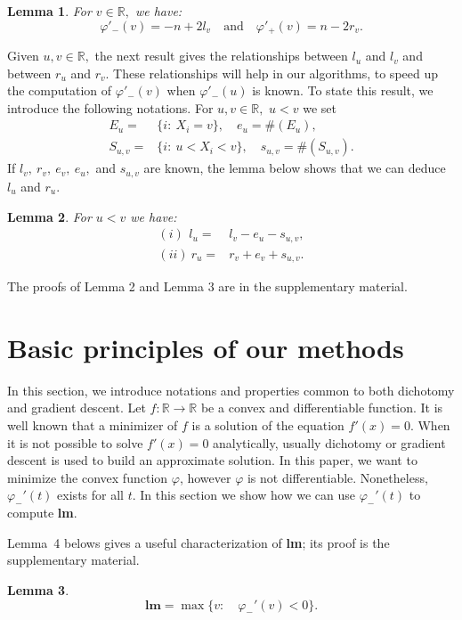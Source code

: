 \documentclass[
  11pt,
  a4paper,
]{article}
\newcommand\R{{\mathbb R}}
\newtheorem{lemma}{Lemma}
\begin{document}
\begin{lemma} For $v\in \R,$ we have:
	\[
	\varphi'_-(v)=-n+2l_v \quad\text{and}\quad \varphi'_+(v)=n-2r_v . \]
\end{lemma}



Given $u,v\in \R,$ the next result gives the relationships between $l_u$ and $l_v$ and between $r_u$ and $r_v$.
These relationships will help in our algorithms, to speed   up the computation of $ \varphi'_-(v)$  when    $\varphi'_-(u)$
is known. To state this result, we introduce the following notations. For $u,v \in \R,$ $u<v$ we set
\begin{align*}
	E_u= &\{i:\ X_i=v\},\quad e_u=\#(E_u),\\
	S_{u,v}=&\{i:\ u< X_i<v\},\quad s_{u,v} =\#(S_{u,v}).
\end{align*}
If $l_v,\ r_v,\ e_v, \ e_u,$ and $s_{u,v}$ are known, the lemma below shows that we can deduce
$l_u$ and $r_u.$


\begin{lemma} For $u<v$ we have:
	\begin{align*}
		(i)\  \, l_u=& l_v-e_u-s_{u,v},\\
		(ii)\   r_u=& r_v+e_v+s_{u,v}.
	\end{align*}
\end{lemma}
The proofs of Lemma 2 and Lemma 3 are in the supplementary material.


\section{Basic principles of our methods }\label{sec:3}

In this section, we introduce notations and properties common to both dichotomy and gradient descent.
Let $f:\R\rightarrow \R$ be a convex and differentiable function. It is well known that a minimizer of
$f$ is a solution of the equation $f'(x)=0.$ When it is not possible to solve $f'(x)=0$ analytically,
usually dichotomy or gradient descent is used to build an approximate solution. In this paper, we want
to minimize the convex function $\varphi$, however $\varphi$ is not differentiable. Nonetheless, $\varphi_{-}'(t)$
exists for all $t.$ In this section we show how we can use $\varphi_{-}'(t)$ to compute \textbf{lm}.

Lemma~4 belows gives a useful characterization of \textbf{lm}; its proof is the supplementary material.
\begin{lemma}
	\[
	\mathbf{lm}=\max\{ v:\quad \varphi_{-}'(v)<0
	\}.
	\]	
\end{lemma}
\end{document}
